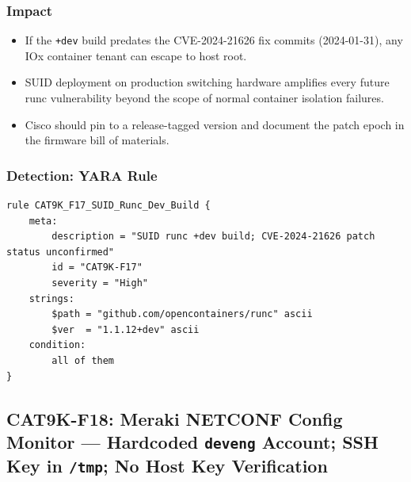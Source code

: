 \documentclass[11pt,a4paper]{article}
\begin{document}
\subsubsection{Impact}

\begin{itemize}[nosep]
  \item If the \texttt{+dev} build predates the CVE-2024-21626 fix commits
    (2024-01-31), any IOx container tenant can escape to host root.
  \item SUID deployment on production switching hardware amplifies every future
    runc vulnerability beyond the scope of normal container isolation failures.
  \item Cisco should pin to a release-tagged version and document the patch epoch
    in the firmware bill of materials.
\end{itemize}

\subsubsection{Detection: YARA Rule}

\begin{lstlisting}[style=yara]
rule CAT9K_F17_SUID_Runc_Dev_Build {
    meta:
        description = "SUID runc +dev build; CVE-2024-21626 patch status unconfirmed"
        id = "CAT9K-F17"
        severity = "High"
    strings:
        $path = "github.com/opencontainers/runc" ascii
        $ver  = "1.1.12+dev" ascii
    condition:
        all of them
}
\end{lstlisting}

\subsection{CAT9K-F18: Meraki NETCONF Config Monitor --- Hardcoded \texttt{deveng} Account; SSH Key in \texttt{/tmp}; No Host Key Verification}
\end{document}
